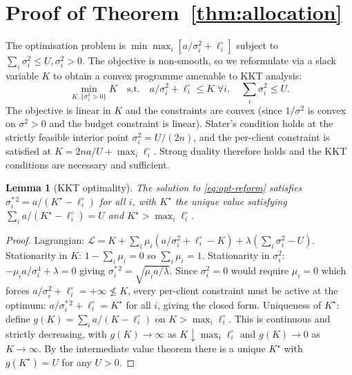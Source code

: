 \documentclass[letterpaper,journal]{IEEEtran}
\newtheorem{lemma}[theorem]{Lemma}
\begin{document}
\section{Proof of Theorem~\ref{thm:allocation}}
\label{app:thm2}

The optimisation problem is
\(\min \max_i [a/\sigma_i^2 + \ell_i^\circ]\) subject to
$\sum_i \sigma_i^2 \leq U, \sigma_i^2 > 0$. The objective is
non-smooth, so we reformulate via a slack variable $K$ to obtain a
convex programme amenable to KKT analysis:
\begin{equation}
\min_{K, \{\sigma_i^2 > 0\}} K
\quad\text{s.t.}\quad
a/\sigma_i^2 + \ell_i^\circ \leq K \;\forall i,
\quad \sum_i \sigma_i^2 \leq U.
\label{eq:opt-reform}
\end{equation}
The objective is linear in $K$ and the constraints are convex (since
$1/\sigma^2$ is convex on $\sigma^2>0$ and the budget constraint is
linear). Slater's condition holds at the strictly feasible interior
point $\sigma_i^2 = U/(2n)$, and the per-client constraint is satisfied
at $K = 2na/U + \max_i \ell_i^\circ$. Strong duality therefore holds
and the KKT conditions are necessary and sufficient.

\begin{lemma}[KKT optimality]
\label{lem:kkt}
The solution to \eqref{eq:opt-reform} satisfies
\(\sigma_i^{*\,2} = a / (K^\star - \ell_i^\circ)\) for all $i$, with
\(K^\star\) the unique value satisfying
\(\sum_i a/(K^\star - \ell_i^\circ) = U\) and \(K^\star > \max_i \ell_i^\circ\).
\end{lemma}
\begin{proof}
Lagrangian:
\(\mathcal{L} = K + \sum_i \mu_i(a/\sigma_i^2 + \ell_i^\circ - K)
                + \lambda(\sum_i \sigma_i^2 - U)\).
Stationarity in $K$: $1 - \sum_i \mu_i = 0$ so $\sum_i \mu_i = 1$.
Stationarity in $\sigma_i^2$:
$-\mu_i a /\sigma_i^4 + \lambda = 0$ giving
$\sigma_i^{*\,2} = \sqrt{\mu_i a / \lambda}$. Since $\sigma_i^2 = 0$ would
require $\mu_i = 0$ which forces $a/\sigma_i^2 + \ell_i^\circ = +\infty
\not\leq K$, every per-client constraint must be active at the optimum:
$a/\sigma_i^{*\,2} + \ell_i^\circ = K^\star$ for all $i$, giving the
closed form. Uniqueness of $K^\star$: define
\(g(K) = \sum_i a/(K - \ell_i^\circ)\) on $K > \max_i \ell_i^\circ$.
This is continuous and strictly decreasing, with
\(g(K) \to \infty\) as $K \downarrow \max_i \ell_i^\circ$ and
\(g(K) \to 0\) as $K \to \infty$. By the intermediate value theorem
there is a unique $K^\star$ with $g(K^\star) = U$ for any $U > 0$.
\end{proof}
\end{document}
